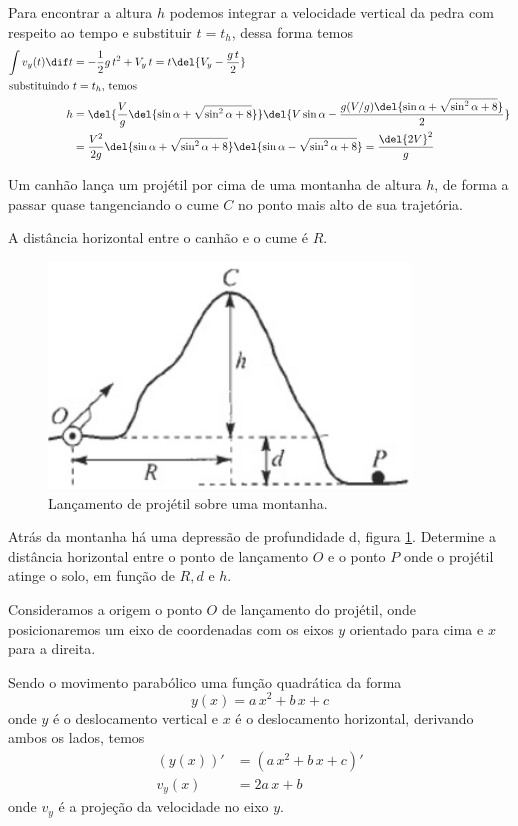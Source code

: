 \documentclass[]{IMTexam}
\begin{document}
\begin{questions}
\begin{solution}
		Para encontrar a altura $ h $ podemos integrar a velocidade vertical da pedra com respeito ao tempo e substituir $ t=t_h $, dessa forma temos
		\begin{align*}
			\int v_y(t)\dif t & =-\dfrac{1}{2}g\,t^{2}+V_y\,t=t\del{V_y-\dfrac{g\,t}{2}}                                                                               \\
			\intertext{substituindo $ t=t_h $, temos}
			h                 & =\del{\dfrac{V}{g}\del{\sin\alpha+\sqrt{\sin^{2}\alpha+8}}}\del{V\sin\alpha-\dfrac{g(V/g)\del{\sin\alpha+\sqrt{\sin^{2}\alpha+8}}}{2}} \\
			                  & =\dfrac{V^{2}}{2g}\del{\sin\alpha+\sqrt{\sin^{2}\alpha+8}}\del{\sin\alpha-\sqrt{\sin^{2}\alpha+8}}=\dfrac{\del{2V}^{2}}{g}
		\end{align*}
	\end{solution}

	\question Um canhão lança um projétil por cima de uma montanha de altura $ h $, de forma a passar quase tangenciando o cume $ C $ no ponto mais alto de sua trajetória.

	A distância horizontal entre o canhão e o cume é $ R $.

	\begin{figure}[H]
		\centering
		\includegraphics[width=0.5\linewidth]{screenshot003}
		\caption{Lançamento de projétil sobre uma montanha.}
		\label{fig:fig2}
	\end{figure}

	Atrás da montanha há uma depressão de profundidade d, figura \ref{fig:fig2}. Determine a distância horizontal entre o ponto de lançamento $ O $ e o ponto $ P $ onde o projétil atinge o solo, em função de $ R, d $ e $ h $.

	\begin{solution}
		Consideramos a origem o ponto $ O $ de lançamento do projétil, onde posicionaremos um eixo de coordenadas com os eixos $ y $ orientado para cima e $ x $ para a direita.

		Sendo o movimento parabólico uma função quadrática da forma \[ y(x)=a\,x^{2}+b\,x+c \]
		onde $ y $ é o deslocamento vertical e $ x $ é o deslocamento horizontal, derivando ambos os lados, temos
		\begin{align*}
			(y(x))' & =(a\,x^{2}+b\,x+c)' \\
			v_y(x)  & =2a\,x+b
		\end{align*}
		onde $ v_y $ é a projeção da velocidade no eixo $ y $.


\end{solution}
\end{questions}
\end{document}

